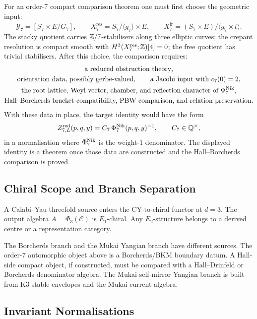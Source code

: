 For an order-7 compact comparison theorem one must first choose the
geometric input:
\[
  \mathcal Y_7=[S_7\times E/G_7],\qquad
  X_7^{\mathrm{res}}=
  \widetilde{S_7/\langle g_7\rangle}\times E,\qquad
  X_7^{\mathrm{fr}}=(S_7\times E)/\langle g_7\times t\rangle .
\]
The stacky quotient carries \(\mathbb{Z}/7\)-stabilisers along three elliptic
curves; the crepant resolution is compact smooth with
\(H^3(X_7^{\mathrm{res}};\mathbb{Z})[4]=0\); the free quotient has trivial
stabilisers.
After this choice, the comparison requires:
\[
\begin{gathered}
  \text{a reduced obstruction theory},\\
  \text{orientation data, possibly gerbe-valued},\qquad
  \text{a Jacobi input with }c_7(0)=2,\\
  \text{the root lattice, Weyl vector, chamber, and reflection
  character of }\Phi_{7}^{\mathrm{Nik}},\\
  \text{Hall--Borcherds bracket compatibility, PBW comparison, and
  relation preservation}.
\end{gathered}
\]
With these data in place, the target identity would have the form
\[
  Z^{\mathrm{red}}_{7,L}(p,q,y)=C_7\,\Phi_{7}^{\mathrm{Nik}}(p,q,y)^{-1},
  \qquad C_7\in\mathbb{Q}^\times,
\]
in a normalisation where \(\Phi_{7}^{\mathrm{Nik}}\) is the weight-\(1\) denominator.
The displayed identity is a theorem once those data are constructed and
the Hall--Borcherds comparison is proved.

\subsection*{Chiral Scope and Branch Separation}

A Calabi--Yau threefold source enters the CY-to-chiral functor at
\(d=3\).  The output algebra \(A=\Phi_3(\mathcal C)\) is \(E_1\)-chiral.
Any \(E_2\)-structure belongs to a derived centre or a representation
category.

The Borcherds branch and the Mukai Yangian branch have different
sources.  The order-7 automorphic object above is a Borcherds/BKM
boundary datum.  A Hall-side compact object, if constructed, must be
compared with a Hall--Drinfeld or Borcherds denominator algebra.  The
Mukai self-mirror Yangian branch is built from K3 stable envelopes and
the Mukai current algebra.

\subsection*{Invariant Normalisations}

